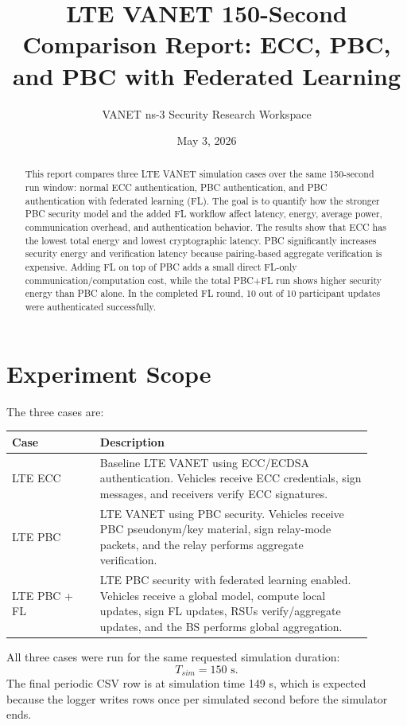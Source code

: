 \documentclass[11pt,a4paper]{article}
\title{LTE VANET 150-Second Comparison Report: ECC, PBC, and PBC with Federated Learning}
\author{VANET ns-3 Security Research Workspace}
\date{May 3, 2026}
\begin{document}
\maketitle

\begin{abstract}
This report compares three LTE VANET simulation cases over the same 150-second
run window: normal ECC authentication, PBC authentication, and PBC authentication
with federated learning (FL). The goal is to quantify how the stronger PBC
security model and the added FL workflow affect latency, energy, average power,
communication overhead, and authentication behavior. The results show that ECC
has the lowest total energy and lowest cryptographic latency. PBC significantly
increases security energy and verification latency because pairing-based
aggregate verification is expensive. Adding FL on top of PBC adds a small direct
FL-only communication/computation cost, while the total PBC+FL run shows higher
security energy than PBC alone. In the completed FL round, 10 out of 10
participant updates were authenticated successfully.
\end{abstract}

\tableofcontents
\newpage

\section{Experiment Scope}

The three cases are:

\begin{longtable}{p{0.22\linewidth}p{0.68\linewidth}}
\toprule
\textbf{Case} & \textbf{Description} \\
\midrule
LTE ECC & Baseline LTE VANET using ECC/ECDSA authentication. Vehicles receive ECC credentials, sign messages, and receivers verify ECC signatures. \\
LTE PBC & LTE VANET using PBC security. Vehicles receive PBC pseudonym/key material, sign relay-mode packets, and the relay performs aggregate verification. \\
LTE PBC + FL & LTE PBC security with federated learning enabled. Vehicles receive a global model, compute local updates, sign FL updates, RSUs verify/aggregate updates, and the BS performs global aggregation. \\
\bottomrule
\end{longtable}

All three cases were run for the same requested simulation duration:
\[
T_{sim}=150\text{ s}.
\]
The final periodic CSV row is at simulation time 149 s, which is expected because
the logger writes rows once per simulated second before the simulator ends.
\end{document}
